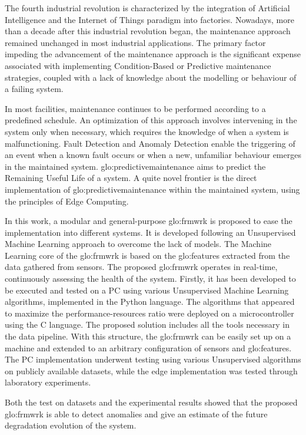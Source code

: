 
The fourth industrial revolution is characterized by the integration of Artificial Intelligence and the Internet of Things paradigm into factories. Nowadays, more than a decade after this industrial revolution began, the maintenance approach remained unchanged in most industrial applications. The primary factor impeding the advancement of the maintenance approach is the significant expense associated with implementing Condition-Based or Predictive maintenance strategies, coupled with a lack of knowledge about the modelling or behaviour of a failing system.

In most facilities, maintenance continues to be performed according to a predefined schedule. An optimization of this approach involves intervening in the system only when necessary, which requires the knowledge of when a system is malfunctioning. Fault Detection and Anomaly Detection enable the triggering of an event when a known fault occurs or when a new, unfamiliar behaviour emerges in the maintained system. \gls{glo:predictivemaintenance} aims to predict the Remaining Useful Life of a system. A quite novel frontier is the direct implementation of \gls{glo:predictivemaintenance} within the maintained system, using the principles of Edge Computing.

In this work, a modular and general-purpose \gls{glo:frmwrk} is proposed to ease the implementation into different systems. It is developed following an Unsupervised Machine Learning approach to overcome the lack of models. The Machine Learning core of the \gls{glo:frmwrk} is based on the \gls{glo:feature}s extracted from the data gathered from sensors. The proposed \gls{glo:frmwrk} operates in real-time, continuously assessing the health of the system. Firstly, it has been developed to be executed and tested on a PC using various Unsupervised Machine Learning algorithms, implemented in the Python language. The algorithms that appeared to maximize the performance-resources ratio were deployed on a microcontroller using the C language. The proposed solution includes all the tools necessary in the data pipeline. With this structure, the \gls{glo:frmwrk} can be easily set up on a machine and extended to an arbitrary configuration of sensors and \gls{glo:feature}s. The PC implementation underwent testing using various Unsupervised algorithms on publicly available datasets, while the edge implementation was tested through laboratory experiments.

Both the test on datasets and the experimental results showed that the proposed \gls{glo:frmwrk} is able to detect anomalies and give an estimate of the future degradation evolution of the system. 
